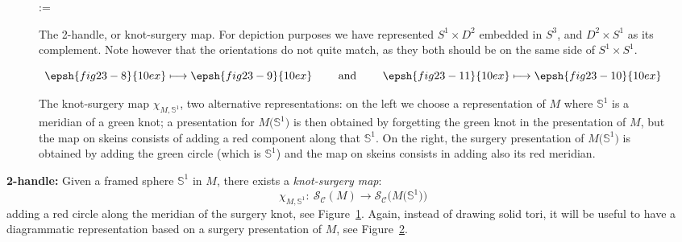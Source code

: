 \documentclass[pdftex]{sigma}
\numberwithin{equation}{section}
\newcommand{\chr}{{\mathsf{c}}}
\numberwithin{theorem}{section}
\numberwithin{proposition}{section}
\numberwithin{definition}{section}
\numberwithin{lemma}{section}
\numberwithin{corollary}{section}
\numberwithin{remark}{section}
\numberwithin{example}{section}
\newcommand{\cat}{\mathcal{C}}
\newcommand{\TSkein}{{\mathscr{S}}}
\newcommand{\Sp}{\mathbb{S}}
\begin{document}
\begin{figure}
\quad := \quad
{}
\begin{tikzpicture}

\end{tikzpicture}
\caption{The 2-handle, or knot-surgery map. For depiction purposes we have represented $S^1\times D^2$ embedded in $S^3$, and $D^2 \times S^1$ as its complement. Note however that the orientations do not quite match, as they both should be on the same side of $S^1 \times S^1$.}
 \label{fig:2handle}
\end{figure}
\begin{figure}[t]
 \[
 \epsh{fig23-8}{10ex} \longmapsto \epsh{fig23-9}{10ex}
 \qquad\text{ and }\qquad
 \epsh{fig23-11}{10ex} \longmapsto \epsh{fig23-10}{10ex}
 \]
 \caption{The knot-surgery map $\chi_{M,\Sp^1}$, two alternative
 representations: on the left we choose a representation of $M$
 where $\Sp^1$ is a meridian of a green knot; a presentation for $M\big(\Sp^1\big)$ is then obtained by forgetting the green knot in the presentation of $M$, but the map on skeins consists of adding a red component along that $\Sp^1$. On the right, the surgery presentation of $M\big(\Sp^1\big)$ is obtained by adding the green circle \big(which is $\Sp^1$\big) and the map on skeins consists in adding also its red meridian.}\label{F:surgery}
\end{figure}
\textbf{2-handle:} Given a framed sphere $\Sp^1$ in $M$,
there exists a \emph{knot-surgery map}:
\[
\chi _{M,{\Sp^1}}\colon\ \TSkein_\cat(M)\to\TSkein_\cat\bigl(M\bigl({\Sp^1}\bigr)\bigr)
\]
adding a red circle along the meridian of the surgery knot, see Figure~\ref{fig:2handle}. Again, instead of drawing solid tori, it will be useful to have a diagrammatic representation based on a surgery presentation of $M$, see Figure~\ref{F:surgery}.
\end{document}

